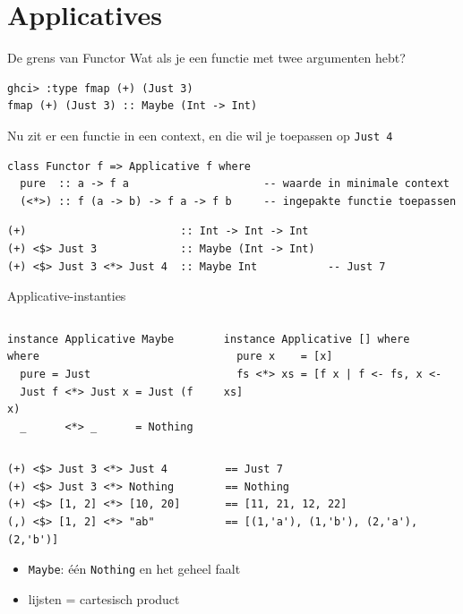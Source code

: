 \documentclass[aspectratio=169,11pt]{beamer}
\newcommand{\hs}{\lstinline[style=hsinline]}
\begin{document}
\section{Applicatives}

\begin{frame}[fragile]{De grens van Functor}
  Wat als je een functie met \alert{twee} argumenten hebt?
\begin{lstlisting}
ghci> :type fmap (+) (Just 3)
fmap (+) (Just 3) :: Maybe (Int -> Int)
\end{lstlisting}
  Nu zit er een \alert{functie} in een context, en die wil je toepassen op \hs{Just 4}
  \pause
\begin{lstlisting}
class Functor f => Applicative f where
  pure  :: a -> f a                     -- waarde in minimale context
  (<*>) :: f (a -> b) -> f a -> f b     -- ingepakte functie toepassen
\end{lstlisting}
  \pause
\begin{lstlisting}
(+)                        :: Int -> Int -> Int
(+) <$> Just 3             :: Maybe (Int -> Int)
(+) <$> Just 3 <*> Just 4  :: Maybe Int           -- Just 7
\end{lstlisting}
\end{frame}

\begin{frame}[fragile]{Applicative-instanties}
  \begin{columns}[T]
\begin{lstlisting}
instance Applicative Maybe where
  pure = Just
  Just f <*> Just x = Just (f x)
  _      <*> _      = Nothing
\end{lstlisting}
\begin{lstlisting}
instance Applicative [] where
  pure x    = [x]
  fs <*> xs = [f x | f <- fs, x <- xs]
\end{lstlisting}
  \end{columns}
  \pause
\begin{lstlisting}
(+) <$> Just 3 <*> Just 4         == Just 7
(+) <$> Just 3 <*> Nothing        == Nothing
(+) <$> [1, 2] <*> [10, 20]       == [11, 21, 12, 22]
(,) <$> [1, 2] <*> "ab"           == [(1,'a'), (1,'b'), (2,'a'), (2,'b')]
\end{lstlisting}
  \pause
  \begin{itemize}
    \item \hs{Maybe}: één \hs{Nothing} en het geheel faalt
    \item lijsten = \alert{cartesisch product}
  \end{itemize}
\end{frame}
\end{document}
